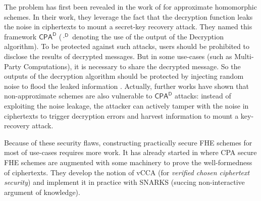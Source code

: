The problem has first been revealed in the work of \cite{EC:LiMic21} for approximate homomorphic schemes. In their work, they leverage the fact that the decryption function leaks the noise in ciphertexts to mount a secret-key recovery attack. They named this framework $\textsf{CPA}^\textsf{D}$ ($\cdot ^ \textsf{D}$ denoting the use of the output of the Decryption algorithm). To be protected against such attacks, users should be prohibited to disclose the results of decrypted messages. But in some use-cases (such as Multi-Party Computations), it is necessary to share the decrypted message. So the outputs of the decryption algorithm should be protected by injecting random noise to flood the leaked information \cite{EPRINT:CheHonKim20}. Actually, further works \cite{C:CSBB24, CCS:CCPSS24} have shown that non-approximate schemes are also vulnerable to $\textsf{CPA}^\textsf{D}$ attacks: instead of exploiting the noise leakage, the attacker can actively tamper with the noise in ciphertexts to trigger decryption errors and harvest information to mount a key-recovery attack.

Because of these security flaws, constructing practically secure FHE schemes for most of use-cases requires more work. It has already started in \cite{EC:ManNgu24, renard} where \textsf{CPA} secure FHE schemes are augmented with some machinery to prove the well-formedness of ciphertexts. They develop the notion of \textsf{vCCA} (for \textit{verified chosen ciphertext security}) and implement it in practice with SNARKS \cite{SNARKS} (succing non-interactive argument of knowledge). 


